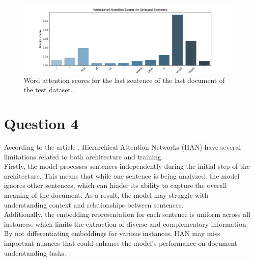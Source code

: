 \documentclass[a4paper]{article}
\begin{document}
\begin{figure}[H]
    \centering
    \includegraphics[width=.7\linewidth]{../figures/word_attention_scores.pdf}
    \caption{Word attention scores for the last sentence of the last document of the test dataset.}
    \label{word-scores}    
\end{figure}

\section{Question 4}
\noindent
According to the article \cite{remy2019bidirectionalcontextawarehierarchicalattention}, Hierarchical Attention
Networks (HAN) have several limitations related to both architecture and training.
\\
Firstly, the model processes sentences independently during the initial step of the architecture. This means
that while one sentence is being analyzed, the model ignores other sentences, which can hinder its
ability to capture the overall meaning of the document. As a result, the model may struggle with
understanding context and relationships between sentences.
\\
Additionally, the embedding representation for each sentence is uniform across all instances, which
limits the extraction of diverse and complementary information. By not differentiating embeddings
for various instances, HAN may miss important nuances that could enhance the model's performance
on document understanding tasks.




\end{document}
